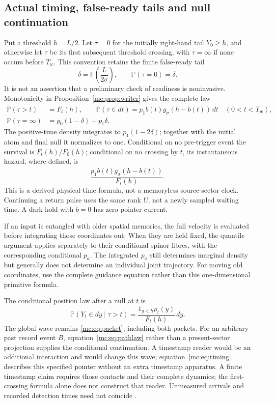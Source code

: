 \documentclass[11pt,oneside,openany]{book}
\theoremstyle{definition}
\theoremstyle{remark}\newtheorem{remark}[theorem]{Remark}
\providecommand{\Prb}{\mathbb P}
\providecommand{\mcNtail}{\overline{\mathsf F}}
\begin{document}
\subsection{Actual timing, false-ready tails and null continuation}
Put a threshold $h=L/2$. Let $\tau=0$ for the initially right-hand tail $Y_0\ge h$, and otherwise let $\tau$ be its first subsequent threshold crossing, with $\tau=\infty$ if none occurs before $T_w$. This convention retains the finite false-ready tail
\[
 \delta=\mcNtail\left(\frac{L}{2\sigma}\right),\qquad \Prb(\tau=0)=\delta.
\]
It is not an assertion that a preliminary check of readiness is noninvasive.
Monotonicity in Proposition~\ref{mc:prop:writer} gives the complete law
\begin{align}\label{mc:eq:timing}
 \Prb(\tau>t)&=F_t(h),\qquad
 \Prb(\tau\in dt)=p_1\dot b(t)g_\sigma(h-b(t))\,dt\quad(0<t<T_w),\\
 \Prb(\tau=\infty)&=p_0(1-\delta)+p_1\delta.\nonumber
\end{align}
The positive-time density integrates to $p_1(1-2\delta)$; together with the initial atom and final null it normalizes to one. Conditional on no pre-trigger event the survival is $F_t(h)/F_0(h)$; conditional on no crossing by $t$, its instantaneous hazard, where defined, is
\begin{equation}\label{mc:eq:hazard}
 \frac{p_1\dot b(t)g_\sigma(h-b(t))}{F_t(h)}.
\end{equation}
This is a derived physical-time formula, not a memoryless source-sector clock. Continuing a return pulse uses the same rank $U$, not a newly sampled waiting time. A dark hold with $\dot b=0$ has zero pointer current.

If an input is entangled with older spatial memories, the full velocity is evaluated before integrating those coordinates out. When they are held fixed, the quantile argument applies separately to their conditional spinor fibres, with the corresponding conditional $p_a$. The integrated $p_a$ still determines marginal density but generally does not determine an individual joint trajectory. For moving old coordinates, use the complete guidance equation rather than this one-dimensional primitive formula.

The conditional position law after a null at $t$ is
\[
 \Prb(Y_t\in dy\mid\tau>t)=\frac{1_{y<h}\rho_t(y)}{F_t(h)}\,dy.
\]
The global wave remains \eqref{mc:eq:packet}, including both packets. For an arbitrary past record event $B$, equation~\eqref{mc:eq:pathlaw} rather than a present-sector projection supplies the conditional continuation. A timestamp reader would be an additional interaction and would change this wave; equation~\eqref{mc:eq:timing} describes this specified pointer without an extra timestamp apparatus. A finite timestamp claim requires those contacts and their complete dynamics; the first-crossing formula alone does not construct that reader. Unmeasured arrivals and recorded detection times need not coincide \cite{mc:Arrival}.
\end{document}
